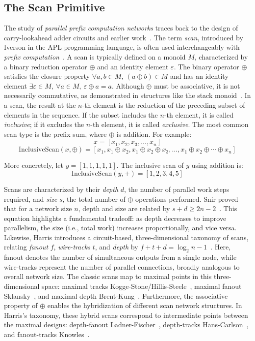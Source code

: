 \documentclass[sigconf]{acmart}
\begin{document}
\subsection{The Scan Primitive}
The study of \emph{parallel prefix computation networks} traces back to the design of carry-lookahead adder circuits and earlier work~\cite{10.1145/322217.322232, 5219801}. The term \emph{scan}, introduced by Iverson in the APL programming language, is often used interchangeably with \emph{prefix computation}~\cite{IVERSON}. A scan is typically defined on a monoid \( M \), characterized by a binary reduction operator \( \oplus \) and an identity element \( \varepsilon \). The binary operator \( \oplus \) satisfies the closure property \( \forall a, b \in M, \ (a \oplus b) \in M \) and has an identity element \( \exists \varepsilon \in M, \ \forall a \in M, \ \varepsilon \oplus a = a \). Although \( \oplus \) must be associative, it is not necessarily commutative, as demonstrated in structures like the stack monoid~\cite{}. In a scan, the result at the \( n \)-th element is the reduction of the preceding subset of elements in the sequence. If the subset includes the \( n \)-th element, it is called \emph{inclusive}; if it excludes the \( n \)-th element, it is called \emph{exclusive}. The most common scan type is the prefix sum, where \( \oplus \) is addition. For example:
\[
  x = [x_1, x_2, x_3, \dots, x_n]
\]
\[
  \text{InclusiveScan}(x, \oplus) = [x_1, x_1 \oplus x_2, x_1 \oplus x_2 \oplus x_3, \dots, x_1 \oplus x_2 \oplus \cdots \oplus x_n]
\]

More concretely, let \( y = [1, 1, 1, 1, 1] \). The inclusive scan of \( y \) using addition is:
\[
  \text{InclusiveScan}(y, +) = [1, 2, 3, 4, 5]
\]

Scans are characterized by their \emph{depth} $d$, the number of parallel work steps required, and \emph{size} $s$, the total number of $\oplus$ operations performed. Snir proved that for a network size $n$, depth and size are related by $s + d \ge 2n - 2$~\cite{}. This equation highlights a fundamental tradeoff: as depth decreases to improve parallelism, the size (i.e., total work) increases proportionally, and vice versa. Likewise, Harris introduces a circuit-based, three-dimensional taxonomy of scans, relating \emph{fanout} $f$, \emph{wire-tracks} $t$, and \emph{depth} by $f + t + d = \log_2n - 1$~\cite{}. Here, fanout denotes the number of simultaneous outputs from a single node, while wire-tracks represent the number of parallel connections, broadly analogous to overall network size. The classic scans map to maximal points in this three-dimensional space: maximal tracks Kogge-Stone/Hillis-Steele~\cite{}, maximal fanout Sklansky~\cite{}, and maximal depth Brent-Kung~\cite{}. Furthermore, the associative property of $\oplus$ enables the hybridization of different scan network structures. In Harris’s taxonomy, these hybrid scans correspond to intermediate points between the maximal designs: depth-fanout Ladner-Fischer~\cite{}, depth-tracks Hans-Carlson~\cite{}, and fanout-tracks Knowles~\cite{}.
\end{document}
